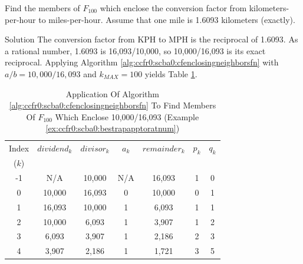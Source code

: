 \begin{vworkexamplestatement}
\label{ex:ccfr0:scba0:bestrapapptoratnum}
Find the members of $F_{100}$ which enclose the conversion factor
from kilometers-per-hour to miles-per-hour.  Assume that 
one mile is 1.6093 kilometers (exactly).
\end{vworkexamplestatement}
\begin{vworkexampleparsection}{Solution}
The conversion factor from KPH to MPH is the reciprocal of 1.6093.  As a rational
number, 1.6093 is 16,093/10,000, so 10,000/16,093 is its exact reciprocal.
Applying Algorithm \ref{alg:ccfr0:scba0:cfenclosingneighborsfn}
with $a/b = 10,000/16,093$ and $k_{MAX} = 100$ yields Table
\ref{tbl:ex:ccfr0:scba0:bestrapapptoratnum}.

\begin{table}
\caption{Application Of Algorithm \ref{alg:ccfr0:scba0:cfenclosingneighborsfn}
         To Find Members Of $F_{100}$ Which Enclose 10,000/16,093 
		 (Example \ref{ex:ccfr0:scba0:bestrapapptoratnum})}
\label{tbl:ex:ccfr0:scba0:bestrapapptoratnum}
\begin{center}
\begin{tabular}{|c|c|c|c|c|c|c|}
\hline
\small{Index} & \small{$dividend_k$}  & \small{$divisor_k$} & \small{$a_k$}   & \small{$remainder_k$} & \small{$p_k$}    & \small{$q_k$}  \\
\small{($k$)} &                       &                     &                 &                       &                  &                \\
\hline
\hline
\small{-1}    & \small{N/A}           & \small{10,000}      & \small{N/A}     & \small{16,093}        & \small{1}        & \small{0}      \\
\hline
\small{0}     & \small{10,000}        & \small{16,093}      & \small{0}       & \small{10,000}        & \small{0}        & \small{1}      \\
\hline
\small{1}     & \small{16,093}        & \small{10,000}      & \small{1}       & \small{6,093}         & \small{1}        & \small{1}      \\ 
\hline
\small{2}     & \small{10,000}        & \small{6,093}       & \small{1}       & \small{3,907}         & \small{1}        & \small{2}      \\ 
\hline
\small{3}     & \small{6,093}         & \small{3,907}       & \small{1}       & \small{2,186}         & \small{2}        & \small{3}      \\
\hline
\small{4}     & \small{3,907}         & \small{2,186}       & \small{1}       & \small{1,721}         & \small{3}        & \small{5}      \\

\end{tabular}
\end{center}
\end{table}
\end{vworkexampleparsection}
